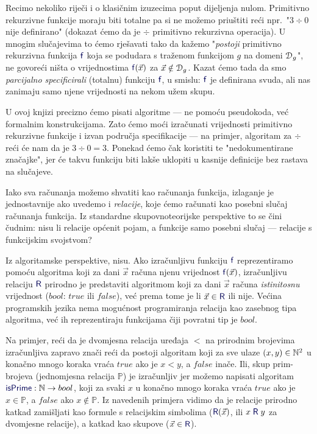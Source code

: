 Recimo nekoliko riječi i o klasičnim izuzecima poput dijeljenja nulom. Primitivno rekurzivne funkcije moraju biti totalne pa si ne možemo priuštiti reći npr.\ "$3\div0$ nije definirano" (dokazat ćemo da je $\div$ primitivno rekurzivna operacija). U mnogim slučajevima to ćemo rješavati tako da kažemo "\emph{postoji} primitivno rekurzivna funkcija $\f{f}$ koja se podudara s traženom funkcijom $g$ na domeni $\mathcal D_{g}$", ne govoreći ništa o vrijednostima $\f{f}(\vec x)$ za $\vec x\notin\mathcal D_{g}$. %
Kazat ćemo tada da smo \emph{parcijalno specificirali} (totalnu) funkciju $\f{f}$, u smislu: $\f{f}$ je definirana svuda, ali nas zanimaju samo njene vrijednosti na nekom užem skupu.

U ovoj knjizi precizno ćemo pisati algoritme --- ne pomoću pseudokoda, već formalnim konstrukcijama. Zato ćemo moći izračunati vrijednosti primitivno rekurzivne funkcije i izvan područja specifikacije --- na primjer, algoritam za $\div$ reći će nam da je $3\div 0=3$. Ponekad ćemo čak koristiti te "nedokumentirane značajke", jer će takvu funkciju biti lakše uklopiti u kasnije definicije bez rastava na slučajeve. %


Iako sva računanja možemo shvatiti kao računanja funkcija, izlaganje je jednostavnije ako uvedemo i \emph{relacije}, koje ćemo računati kao posebni slučaj računanja funkcija. Iz standardne skupovnoteorijske perspektive to se čini čudnim: nisu li relacije općenit pojam, a funkcije samo posebni slučaj --- relacije s funkcijskim svojstvom?

Iz algoritamske perspektive, nisu. Ako izračunljivu funkciju $\f{f}$ reprezentiramo po\-mo\-ću algoritma koji za dani $\vec x$ računa njenu vrijednost $\f{f}(\vec x)$, izračunljivu relaciju $\f{R}$ prirodno je predstaviti algoritmom koji za dani $\vec x$ računa \emph{istinitosnu} vrijednost ($bool$: $\mathit{true}$ ili $\mathit{false}$), već prema tome je li $\vec x\in\f{R}$ ili nije. Većina programskih jezika nema mogućnost programiranja relacija kao zasebnog tipa algoritma, već ih reprezentiraju funkcijama čiji povratni tip je $bool$.

Na primjer, reći da je dvomjesna relacija uređaja $<$ na prirodnim brojevima iz\-ra\-čun\-lji\-va zapravo znači reći da postoji algoritam koji za sve ulaze $(x,y)\in{\mathbb N}^2$ u konačno mnogo koraka vraća $\mathit{true}$ ako je $x<y$, a $\mathit{false}$ inače. Ili, skup prim-brojeva (jednomjesna relacija $\mathbb P$) je izračunljiv jer možemo napisati algoritam $\f{isPrime}:\N\to bool$, koji za svaki $x$ u konačno mnogo koraka vraća $\mathit{true}$ ako je $x\in\mathbb P$, a $\mathit{false}$ ako $x\notin\mathbb P$. Iz navedenih primjera vidimo da je relacije prirodno katkad zamišljati kao formule s relacijskim simbolima ($\f{R}(\vec x)$, ili $x\mathrel{\f R}y$ za dvomjesne relacije), a katkad kao skupove ($\vec x\in\f{R}$).

